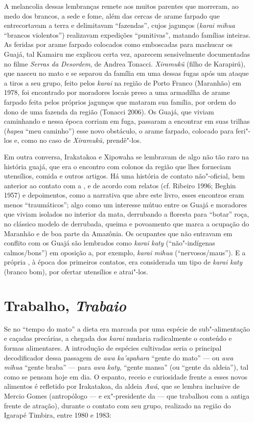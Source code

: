 A melancolia dessas lembranças remete aos muitos parentes que morreram,
ao medo dos brancos, a sede e fome, além das cercas de arame farpado que
entrecortavam a terra e delimitavam ``fazendas'', cujos jagunços
(\emph{karai mihua} ``brancos violentos'') realizavam expedições
``punitivas'', matando famílias inteiras. As feridas por arame farpado
colocados como emboscadas para machucar os Guajá, tal Kamairu me
explicou certa vez, aparecem sensivelmente documentadas no filme
\emph{Serras da Desordem}, de Andrea Tonacci. \emph{Xiramukũ} (filho de
Karapirú), que nasceu no mato e se separou da família em uma dessas
fugas após um ataque a tiros a seu grupo, feito pelos \emph{karai} na
região de Porto Franco (Maranhão) em 1978, foi encontrado por moradores
locais preso a uma armadilha de arame farpado feita pelos próprios
jagunços que mataram sua família, por ordem do dono de uma fazenda da
região (Tonacci 2006). Os Guajá, que viviam caminhando e nessa época
corriam em fuga, passaram a encontrar em suas trilhas (\emph{hapea}
``meu caminho'') esse novo obstáculo, o arame farpado, colocado para
feri"-los e, como no caso de \emph{Xiramukũ}, prendê"-los.

Em outra conversa, Irakatakoa e Xipowaha se lembravam de algo não tão
raro na história guajá, que era o encontro com colonos da região que
lhes forneciam utensílios, comida e outros artigos. Há uma história de
contato não"-oficial, bem anterior ao contato com a , e de acordo
com relatos (cf. Ribeiro 1996; Beghin 1957) e depoimentos, como a
narrativa que abre este livro, esses encontros eram menos ``traumáticos'';
algo como um interesse mútuo entre os Guajá e moradores que viviam
isolados no interior da mata, derrubando a floresta para ``botar'' roça,
no clássico modelo de derrubada, queima e povoamento que marca a
ocupação do Maranhão e de boa parte da Amazônia. Os ocupantes que não
entravam em conflito com os Guajá são lembrados como \emph{karai katy}
(``não"-indígenas calmos/bons'') em oposição a, por exemplo, \emph{karai}
\emph{mihua} (``nervosos/maus''). E a própria , à época dos
primeiros contatos, era considerada um tipo de \emph{karai katy} (branco
bom), por ofertar utensílios e atrai"-los.

\section{Trabalho, \emph{Trabaio}}

Se no ``tempo do mato'' a dieta era marcada por uma espécie de
sub"-alimentação e caçadas precárias, a chegada dos \emph{karai} mudaria
radicalmente o conteúdo e formas alimentares. A introdução de espécies
cultivadas seria o principal decodificador dessa passagem de \emph{awa
ka'apahara} ``gente do mato'' --- ou \emph{awa mihua} ``gente braba'' ---
para \emph{awa katy}, ``gente mansa'' (ou ``gente da aldeia''), tal como
se pensam hoje em dia. O espanto, receio e curiosidade frente a esses
novos alimentos é refletido por Irakatakoa, da aldeia \emph{Awá}, que se
lembra inclusive de Mercio Gomes (antropólogo --- e ex"-presidente da 
--- que trabalhou com a antiga frente de atração), durante o contato com
seu grupo, realizado na região do Igarapé Timbira, entre 1980 e 1983:

